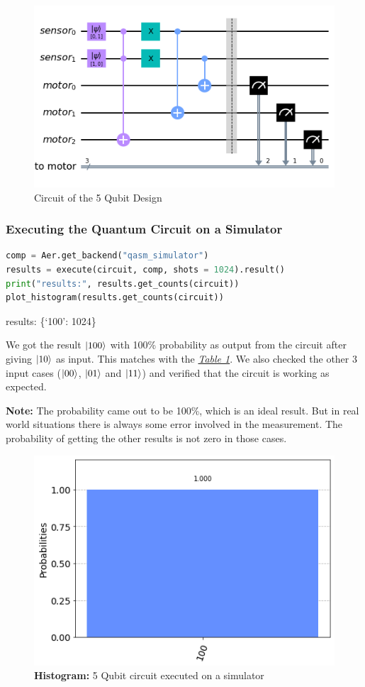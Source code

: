 \begin{figure}[h]%
	\centering
	\includegraphics[width=0.9\linewidth]{./images/5qubit_qc.png}
	\caption{Circuit of the 5 Qubit Design}%
	\label{fig:5qubit_qc}%
\end{figure}

\subsubsection{Executing the Quantum Circuit on a Simulator}
\label{code:executing_the_quantum_circuit_on_a_simulator}
\begin{lstlisting}[language=Python]
comp = Aer.get_backend("qasm_simulator")
results = execute(circuit, comp, shots = 1024).result()
print("results:", results.get_counts(circuit))
plot_histogram(results.get_counts(circuit))\end{lstlisting}

{\selectfont \noindent results: \{`100': 1024\}}
\vspace{5mm}

We got the result $\ket{100}$ with 100\% probability as output from the circuit after giving $\ket{10}$ as input. This matches with the \hyperref[table:1]{\textit{Table 1}}. We also checked the other 3 input cases ($\ket{00}$, $\ket{01}$ and $\ket{11}$) and verified that the circuit is working as expected.

\textbf{Note:} The probability came out to be 100\%, which is an ideal result. But in real world situations there is always some error involved in the measurement. The probability of getting the other results is not zero in those cases.

\begin{figure}[h]%
	\centering
	\includegraphics[width=0.7\linewidth]{./images/5qubit_sim.png}
	\caption{\textbf{Histogram:} 5 Qubit circuit executed on a simulator}%
	\label{fig:5qubit_sim}%
\end{figure}



